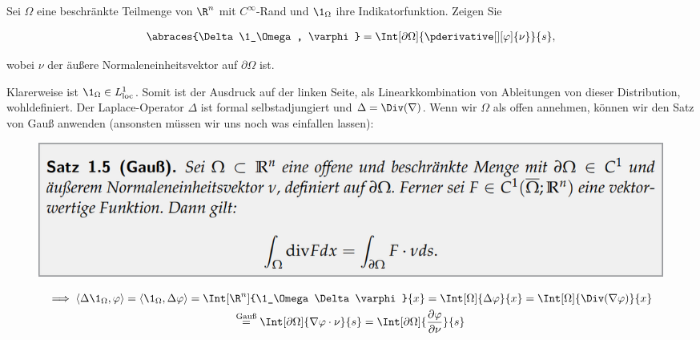 
\begin{exercise}

Sei $\Omega$ eine beschränkte Teilmenge von $\R^n$ mit $C^{\infty}$-Rand und $\1_\Omega$ ihre Indikatorfunktion.
Zeigen Sie

\begin{align*}
  \abraces{\Delta \1_\Omega, \varphi}
  =
  \Int[\partial \Omega]{\pderivative[][\varphi]{\nu}}{s},
\end{align*}

wobei $\nu$ der äußere Normaleneinheitsvektor auf $\partial \Omega$ ist.

\end{exercise}


\begin{solution}

Klarerweise ist $\1_\Omega \in L^1_{\mathrm{loc}}$.
Somit ist der Ausdruck auf der linken Seite, als Linearkkombination von Ableitungen von dieser Distribution, wohldefiniert.
Der Laplace-Operator $\Delta$ ist formal selbstadjungiert und $\Delta = \Div(\nabla)$.
Wenn wir $\Omega$ als offen annehmen, können wir den Satz von Gauß anwenden
(ansonsten müssen wir uns noch was einfallen lassen):
\begin{figure}[h!]
  \centering
  \includegraphics[width = 0.75 \textwidth]{Satz 1.5 (Gauß).png}
\end{figure}

\begin{multline*}
  \implies
  \langle \Delta \1_\Omega, \varphi \rangle
  =
  \langle  \1_\Omega, \Delta \varphi \rangle
  =
  \Int[\R^n]{\1_\Omega \Delta \varphi}{x}
  =
  \Int[\Omega]{\Delta \varphi}{x}
  =
  \Int[\Omega]{\Div(\nabla \varphi)}{x} \\
  \stackrel{\text{Gauß}}{=}
  \Int[\partial \Omega]{\nabla \varphi \cdot \nu}{s}
  =
  \Int[\partial \Omega]{\frac{\partial \varphi}{\partial \nu}}{s}
\end{multline*}

\end{solution}

